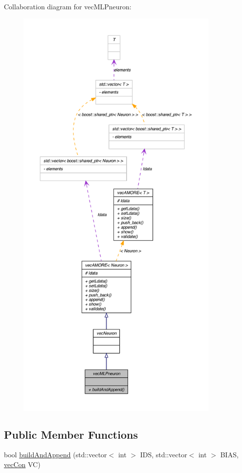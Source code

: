 Collaboration diagram for vecMLPneuron:\nopagebreak
\begin{figure}[H]
\begin{center}
\leavevmode
\includegraphics[height=600pt]{classvec_m_l_pneuron__coll__graph}
\end{center}
\end{figure}
\subsection*{Public Member Functions}
\begin{DoxyCompactItemize}
\item 
bool \hyperlink{classvec_m_l_pneuron_a8f9e8ee0deffd9eaafe25d4d3e3ebb3f}{buildAndAppend} (std::vector$<$ int $>$ IDS, std::vector$<$ int $>$ BIAS, \hyperlink{classvec_con}{vecCon} VC)
\end{DoxyCompactItemize}


